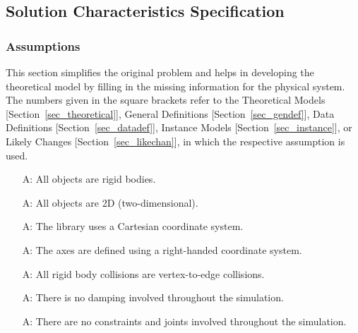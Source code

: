 \documentclass[12pt]{article}
\newcounter{assumpnum} %
\begin{document}

\subsection{Solution Characteristics Specification}

\subsubsection{Assumptions}
\label{sec_assu}
This section simplifies the original problem and helps in developing the theoretical model by filling in
the missing information for the physical system. The numbers given in the square brackets refer to the
Theoretical Models [Section~\ref{sec_theoretical}], General Definitions [Section~\ref{sec_gendef}],
Data Definitions [Section~\ref{sec_datadef}], Instance Models [Section~\ref{sec_instance}], 
or Likely Changes [Section~\ref{sec_likechan}], in which the respective assumption is used.

\begin{itemize}
\item [A\refstepcounter{assumpnum}\theassumpnum \label{A_rigid}:] All objects are rigid bodies.

\item [A\refstepcounter{assumpnum}\theassumpnum \label{A_2d}:] All objects are 2D (two-dimensional).

\item[A\refstepcounter{assumpnum}\theassumpnum \label{A_cartesian}:]  The library uses a Cartesian coordinate system.

\item[A\refstepcounter{assumpnum}\theassumpnum \label{A_right}:] The axes are defined using a right-handed coordinate system.

\item[A\refstepcounter{assumpnum}\theassumpnum \label{A_col}:] All rigid body collisions are vertex-to-edge collisions.

\item[A\refstepcounter{assumpnum}\theassumpnum \label{A_damping}:] There is no
  damping involved throughout the simulation.  

\item[A\refstepcounter{assumpnum}\theassumpnum \label{A_constraints}:] There are no constraints and joints involved throughout the simulation.

\end{itemize}
\end{document}

